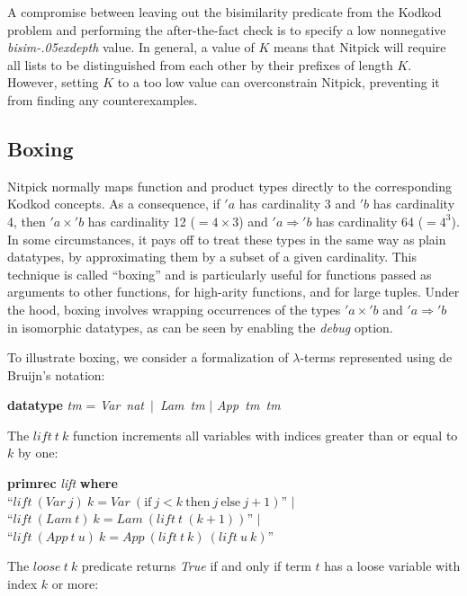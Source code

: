 \documentclass[a4paper,12pt]{article}
\renewcommand\_{\hbox{\textunderscore\kern-.05ex}}
\begin{document}
A compromise between leaving out the bisimilarity predicate from the Kodkod
problem and performing the after-the-fact check is to specify a low
nonnegative \textit{bisim\_depth} value. In general, a value of $K$ means that
Nitpick will require all lists to be distinguished from each other by their
prefixes of length $K$. However, setting $K$ to a too low value can
overconstrain Nitpick, preventing it from finding any counterexamples.

\subsection{Boxing}
\label{boxing}

Nitpick normally maps function and product types directly to the corresponding
Kodkod concepts. As a consequence, if $'a$ has cardinality 3 and $'b$ has
cardinality 4, then $'a \times {'}b$ has cardinality 12 ($= 4 \times 3$) and $'a
\Rightarrow {'}b$ has cardinality 64 ($= 4^3$). In some circumstances, it pays
off to treat these types in the same way as plain datatypes, by approximating
them by a subset of a given cardinality. This technique is called ``boxing'' and
is particularly useful for functions passed as arguments to other functions, for
high-arity functions, and for large tuples. Under the hood, boxing involves
wrapping occurrences of the types $'a \times {'}b$ and $'a \Rightarrow {'}b$ in
isomorphic datatypes, as can be seen by enabling the \textit{debug} option.

To illustrate boxing, we consider a formalization of $\lambda$-terms represented
using de Bruijn's notation:

\prew
\textbf{datatype} \textit{tm} = \textit{Var}~\textit{nat}~$\mid$~\textit{Lam}~\textit{tm} $\mid$ \textit{App~tm~tm}
\postw

The $\textit{lift}~t~k$ function increments all variables with indices greater
than or equal to $k$ by one:

\prew
\textbf{primrec} \textit{lift} \textbf{where} \\
``$\textit{lift}~(\textit{Var}~j)~k = \textit{Var}~(\textrm{if}~j < k~\textrm{then}~j~\textrm{else}~j + 1)$'' $\mid$ \\
``$\textit{lift}~(\textit{Lam}~t)~k = \textit{Lam}~(\textit{lift}~t~(k + 1))$'' $\mid$ \\
``$\textit{lift}~(\textit{App}~t~u)~k = \textit{App}~(\textit{lift}~t~k)~(\textit{lift}~u~k)$''
\postw

The $\textit{loose}~t~k$ predicate returns \textit{True} if and only if
term $t$ has a loose variable with index $k$ or more:
\end{document}

